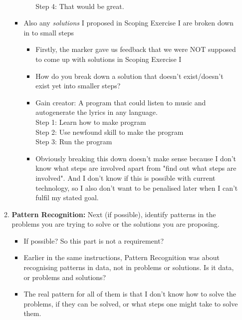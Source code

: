 \documentclass[12pt]{article}
\begin{document}
\begin{itemize}
\begin{enumerate}
\begin{itemize}
\begin{itemize}
                \\Step 4: That would be great.
            \end{itemize}
            \item Also any \textit{solutions} I proposed in Scoping Exercise I are broken down in to small steps
            \begin{itemize}
                \item Firstly, the marker gave us feedback that we were NOT supposed to come up with solutions in Scoping Exercise I
                \item How do you break down a solution that doesn't exist/doesn't exist yet into smaller steps?
                \vspace{0.5em}
                \item Gain creator: A program that could listen to music and autogenerate the lyrics in any language.
                \\Step 1: Learn how to make program
                \\Step 2: Use newfound skill to make the program
                \\Step 3: Run the program
                \vspace{0.5em}
                \item Obviously breaking this down doesn't make sense because I don't know what steps are involved apart from "find out what steps are involved". And I don't know if this is possible with current technology, so I also don't want to be penalised later when I can't fulfil my stated goal.
                \end{itemize}
        \end{itemize}
        \item \textbf{Pattern Recognition:} Next (if possible), identify patterns in the problems you are trying to solve or the solutions you are proposing.
        \begin{itemize}
            \item If possible? So this part is not a requirement? 
            \item Earlier in the same instructions, Pattern Recognition was about recognising patterns in data, not in problems or solutions. Is it data, or problems and solutions?
            \item The real pattern for all of them is that I don't know how to solve the problems, if they can be solved, or what steps one might take to solve them.
        \end{itemize}

\end{enumerate}
\end{itemize}
\end{document}
